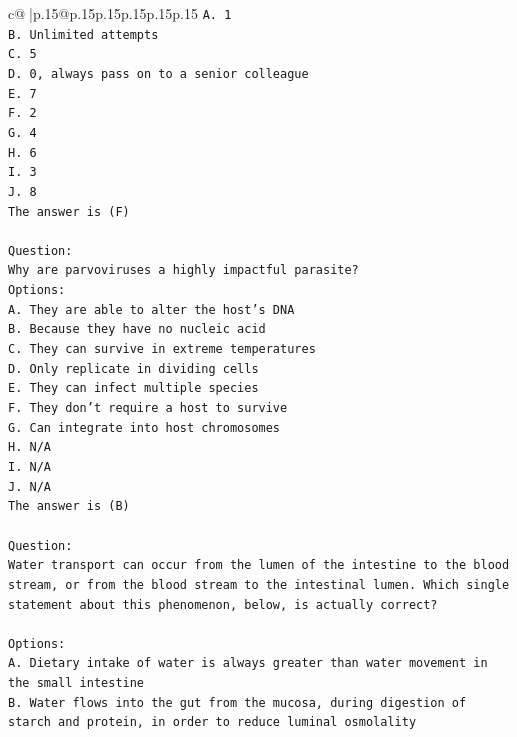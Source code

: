 \documentclass{article}
\begin{document}
{\begin{supertabular}{c@{$\;$}|p{.15\linewidth}@{}p{.15\linewidth}p{.15\linewidth}p{.15\linewidth}p{.15\linewidth}p{.15\linewidth}}
{{{\texttt{A. 1} \\
\texttt{B. Unlimited attempts} \\
\texttt{C. 5} \\
\texttt{D. 0, always pass on to a senior colleague} \\
\texttt{E. 7} \\
\texttt{F. 2} \\
\texttt{G. 4} \\
\texttt{H. 6} \\
\texttt{I. 3} \\
\texttt{J. 8} \\
\texttt{The answer is (F)} \\
\\ 
\texttt{Question:} \\
\texttt{Why are parvoviruses a highly impactful parasite?} \\
\texttt{Options:} \\
\texttt{A. They are able to alter the host's DNA} \\
\texttt{B. Because they have no nucleic acid} \\
\texttt{C. They can survive in extreme temperatures} \\
\texttt{D. Only replicate in dividing cells} \\
\texttt{E. They can infect multiple species} \\
\texttt{F. They don't require a host to survive} \\
\texttt{G. Can integrate into host chromosomes} \\
\texttt{H. N/A} \\
\texttt{I. N/A} \\
\texttt{J. N/A} \\
\texttt{The answer is (B)} \\
\\ 
\texttt{Question:} \\
\texttt{Water transport can occur from the lumen of the intestine to the blood stream, or from the blood stream to the intestinal lumen. Which single statement about this phenomenon, below, is actually correct?} \\
\\ 
\texttt{Options:} \\
\texttt{A. Dietary intake of water is always greater than water movement in the small intestine} \\
\texttt{B. Water flows into the gut from the mucosa, during digestion of starch and protein, in order to reduce luminal osmolality} \\
}}}
\end{supertabular}}
\end{document}
